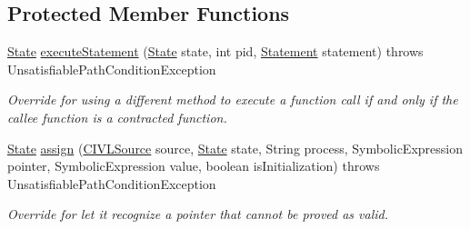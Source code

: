 \subsection*{Protected Member Functions}
\begin{DoxyCompactItemize}
\item 
\hypertarget{classedu_1_1udel_1_1cis_1_1vsl_1_1civl_1_1semantics_1_1contract_1_1ContractExecutor_ad8b70c7a0a48adfff3e67e3d62a658ec}{}\hyperlink{interfaceedu_1_1udel_1_1cis_1_1vsl_1_1civl_1_1state_1_1IF_1_1State}{State} \hyperlink{classedu_1_1udel_1_1cis_1_1vsl_1_1civl_1_1semantics_1_1contract_1_1ContractExecutor_ad8b70c7a0a48adfff3e67e3d62a658ec}{execute\+Statement} (\hyperlink{interfaceedu_1_1udel_1_1cis_1_1vsl_1_1civl_1_1state_1_1IF_1_1State}{State} state, int pid, \hyperlink{interfaceedu_1_1udel_1_1cis_1_1vsl_1_1civl_1_1model_1_1IF_1_1statement_1_1Statement}{Statement} statement)  throws Unsatisfiable\+Path\+Condition\+Exception \label{classedu_1_1udel_1_1cis_1_1vsl_1_1civl_1_1semantics_1_1contract_1_1ContractExecutor_ad8b70c7a0a48adfff3e67e3d62a658ec}

\begin{DoxyCompactList}\small\item\em Override for using a different method to execute a function call if and only if the callee function is a contracted function. \end{DoxyCompactList}\item 
\hypertarget{classedu_1_1udel_1_1cis_1_1vsl_1_1civl_1_1semantics_1_1contract_1_1ContractExecutor_a6cbe196a67b85202ddefe1bb729bb976}{}\hyperlink{interfaceedu_1_1udel_1_1cis_1_1vsl_1_1civl_1_1state_1_1IF_1_1State}{State} \hyperlink{classedu_1_1udel_1_1cis_1_1vsl_1_1civl_1_1semantics_1_1contract_1_1ContractExecutor_a6cbe196a67b85202ddefe1bb729bb976}{assign} (\hyperlink{interfaceedu_1_1udel_1_1cis_1_1vsl_1_1civl_1_1model_1_1IF_1_1CIVLSource}{C\+I\+V\+L\+Source} source, \hyperlink{interfaceedu_1_1udel_1_1cis_1_1vsl_1_1civl_1_1state_1_1IF_1_1State}{State} state, String process, Symbolic\+Expression pointer, Symbolic\+Expression value, boolean is\+Initialization)  throws Unsatisfiable\+Path\+Condition\+Exception \label{classedu_1_1udel_1_1cis_1_1vsl_1_1civl_1_1semantics_1_1contract_1_1ContractExecutor_a6cbe196a67b85202ddefe1bb729bb976}

\begin{DoxyCompactList}\small\item\em Override for let it recognize a pointer that cannot be proved as valid. \end{DoxyCompactList}\end{DoxyCompactItemize}
